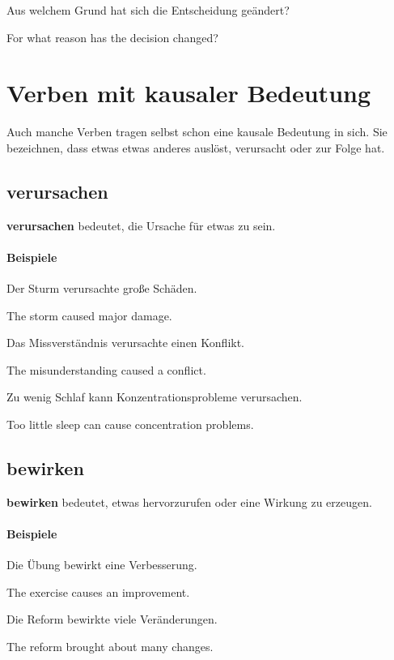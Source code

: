 \documentclass[a4paper]{article}
\newcommand{\EN}[1]{\par{\small\textcolor{TranslationGray}{#1}}\vspace{0.25em}}
\begin{document}
        Aus welchem Grund hat sich die Entscheidung geändert?\\
        \EN{For what reason has the decision changed?}
    
    
    \section{Verben mit kausaler Bedeutung}
    Auch manche Verben tragen selbst schon eine kausale Bedeutung in sich. Sie bezeichnen, dass etwas etwas anderes auslöst, verursacht oder zur Folge hat.
    
    \subsection{verursachen}
        \textbf{verursachen} bedeutet, die Ursache für etwas zu sein.
        
        \paragraph{Beispiele}
            Der Sturm verursachte große Schäden.\\
            \EN{The storm caused major damage.}
            
            Das Missverständnis verursachte einen Konflikt.\\
            \EN{The misunderstanding caused a conflict.}
            
            Zu wenig Schlaf kann Konzentrationsprobleme verursachen.\\
            \EN{Too little sleep can cause concentration problems.}
    
    \subsection{bewirken}
    \textbf{bewirken} bedeutet, etwas hervorzurufen oder eine Wirkung zu erzeugen.
    
    \paragraph{Beispiele}
        Die Übung bewirkt eine Verbesserung.\\
        \EN{The exercise causes an improvement.}
        
        Die Reform bewirkte viele Veränderungen.\\
        \EN{The reform brought about many changes.}
        
\end{document}
